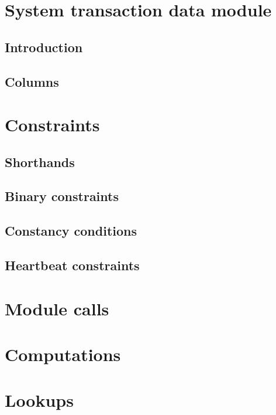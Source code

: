 
\section{System transaction data module}          \label{system transaction: generalities}
\subsection{Introduction}                         \label{system transaction: generalities: intro}             
\subsection{Columns}                              \label{system transaction: generalities: columns}           

\section{Constraints}                             \label{system transaction: constraints}    
\subsection{Shorthands}                           \label{system transaction: constraints: shorthands}         
\subsection{Binary constraints}                   \label{system transaction: constraints: binary}             
\subsection{Constancy conditions}                 \label{system transaction: constraints: constancies}        
\subsection{Heartbeat constraints}                \label{system transaction: constraints: heartbeat}          

\section{Module calls}                            \label{system transaction: module calls}                    

\section{Computations}                            \label{system transaction: computations}                    

\section{Lookups}                                 \label{system transaction: lookups}                         
